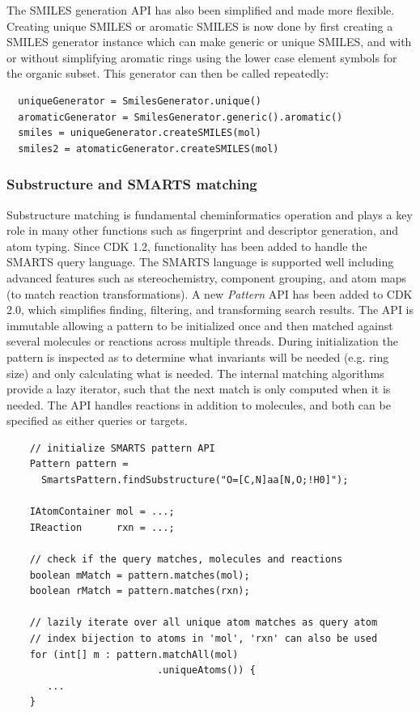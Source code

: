 \documentclass[10pt]{bmcart}
\def \cdkversion {2.0}
\begin{document}
The SMILES generation API has also been simplified and made more flexible.
Creating unique SMILES or aromatic SMILES is now done by first creating a
SMILES generator instance which can make generic or unique SMILES, and with
or without simplifying aromatic rings using the lower case element symbols
for the organic subset. This generator can then be called repeatedly:

\vspace{0.2cm}
\begin{verbatim}
  uniqueGenerator = SmilesGenerator.unique()
  aromaticGenerator = SmilesGenerator.generic().aromatic()
  smiles = uniqueGenerator.createSMILES(mol)
  smiles2 = atomaticGenerator.createSMILES(mol)
\end{verbatim}
\vspace{0.2cm}

\subsubsection*{Substructure and SMARTS matching}

Substructure matching is fundamental cheminformatics operation and
plays a key role in many other functions such as fingerprint and
descriptor generation, and atom typing. Since CDK 1.2, functionality
has been added to handle the SMARTS query language. The SMARTS
language is supported well including advanced features such as
stereochemistry, component grouping, and atom
maps (to match reaction transformations). A new \textit{Pattern} API
has been added to CDK \cdkversion{}, which simplifies finding,
filtering, and transforming search results. The API is immutable allowing a
pattern to be initialized once and then matched against several
molecules or reactions across multiple threads. During initialization
the pattern is inspected as to determine what invariants will be
needed (e.g. ring size) and only calculating what is needed. The
internal matching algorithms provide a lazy iterator, such that the
next match is only computed when it is needed. The API handles
reactions in addition to molecules, and both can be specified as
either queries or targets.

\vspace{0.2cm}
  \begin{verbatim}
    // initialize SMARTS pattern API
    Pattern pattern = 
      SmartsPattern.findSubstructure("O=[C,N]aa[N,O;!H0]");

    IAtomContainer mol = ...;
    IReaction      rxn = ...;

    // check if the query matches, molecules and reactions
    boolean mMatch = pattern.matches(mol);
    boolean rMatch = pattern.matches(rxn);         

    // lazily iterate over all unique atom matches as query atom
    // index bijection to atoms in 'mol', 'rxn' can also be used
    for (int[] m : pattern.matchAll(mol)
                          .uniqueAtoms()) {
       ...
    }
  \end{verbatim}
\vspace{0.2cm}
\end{document}
